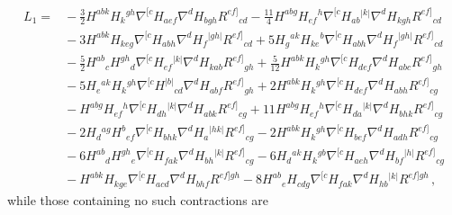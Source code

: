 \documentclass[a4paper,11pt]{article}
\begin{document}
\begin{equation}
\begin{aligned}
L_1=
&{}
-\frac32H^{abk}H_k{}^{gh}\nabla^{[c}H_{aef}\nabla^dH_{bgh}R^{ef]}{}_{cd}
-\frac{11}{4}H^{abg}H_{ef}{}^h\nabla^{[c}H_{ab}{}^{|k|}\nabla^dH_{kgh}R^{ef]}{}_{cd}
\\&{}
-3H^{abk}H_{keg}\nabla^{[c}H_{abh}\nabla^dH_f{}^{|gh|}R^{ef]}{}_{cd}
+5H_g{}^{ak}H_{ke}{}^b\nabla^{[c}H_{abh}\nabla^dH_f{}^{|gh|}R^{ef]}{}_{cd}
\\&{}
-\frac52H^{ab}{}_cH^{gh}{}_d\nabla^{[c}H_{ef}{}^{|k|}\nabla^dH_{kab}R^{ef]}{}_{gh}
+\frac{5}{12}H^{abk}H_k{}^{gh}\nabla^{[c}H_{def}\nabla^dH_{abc}R^{ef]}{}_{gh}
\\&{}
-5H_e{}^{ak}H_k{}^{gh}\nabla^{[c}H^{|b|}{}_{cd}\nabla^dH_{abf}R^{ef]}{}_{gh}
+2H^{abk}H_k{}^{gh}\nabla^{[c}H_{def}\nabla^dH_{abh}R^{ef]}{}_{cg}
\\&{}
-H^{abg}H_{ef}{}^h\nabla^{[c}H_{dh}{}^{|k|}\nabla^dH_{abk}R^{ef]}{}_{cg}
+11H^{abg}H_{ef}{}^h\nabla^{[c}H_{da}{}^{|k|}\nabla^dH_{bhk}R^{ef]}{}_{cg}
\\&{}
-2H_d{}^{ag}H^b{}_{ef}\nabla^{[c}H_{bhk}\nabla^dH_a{}^{|hk|}R^{ef]}{}_{cg}
-2H^{abk}H_k{}^{gh}\nabla^{[c}H_{bef}\nabla^dH_{adh}R^{ef]}{}_{cg}
\\&{}
-6H^{ab}{}_dH^{gh}{}_e\nabla^{[c}H_{fak}\nabla^dH_{bh}{}^{|k|}R^{ef]}{}_{cg}
-6H_d{}^{ak}H_k{}^{gb}\nabla^{[c}H_{aeh}\nabla^dH_{bf}{}^{|h|}R^{ef]}{}_{cg}
\\&{}
-H^{abk}H_{kge}\nabla^{[c}H_{acd}\nabla^dH_{bhf}R^{ef]gh}
-8H^{ab}{}_eH_{cdg}\nabla^{[c}H_{fak}\nabla^dH_{hb}{}^{|k|}R^{ef]gh}\,,
\end{aligned}
\label{eq:L1}
\end{equation}
while those containing no such contractions are
\iffalse
\end{document}
